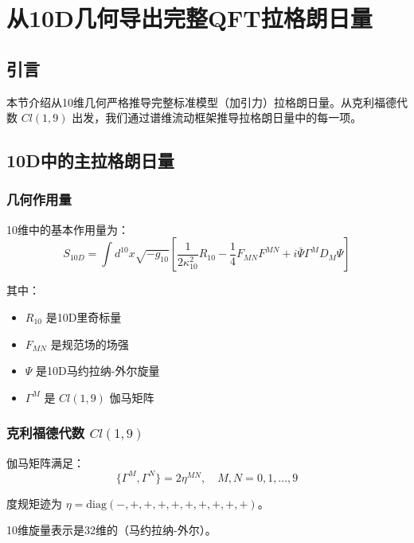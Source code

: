 \section{从10D几何导出完整QFT拉格朗日量}
\label{sec:qft_lagrangian_complete}

\subsection{引言}

本节介绍从10维几何严格推导完整标准模型（加引力）拉格朗日量。从克利福德代数 $Cl(1,9)$ 出发，我们通过谱维流动框架推导拉格朗日量中的每一项。

\subsection{10D中的主拉格朗日量}

\subsubsection{几何作用量}

10维中的基本作用量为：
\begin{equation}
    S_{10D} = \int d^{10}x \sqrt{-g_{10}} \left[ \frac{1}{2\kappa_{10}^2}R_{10} - \frac{1}{4}F_{MN}F^{MN} + i\bar{\Psi}\Gamma^M D_M \Psi \right]
\end{equation}

其中：
\begin{itemize}
    \item $R_{10}$ 是10D里奇标量
    \item $F_{MN}$ 是规范场的场强
    \item $\Psi$ 是10D马约拉纳-外尔旋量
    \item $\Gamma^M$ 是 $Cl(1,9)$ 伽马矩阵
\end{itemize}

\subsubsection{克利福德代数 $Cl(1,9)$}

伽马矩阵满足：
\begin{equation}
    \{\Gamma^M, \Gamma^N\} = 2\eta^{MN}, \quad M,N = 0,1,\ldots,9
\end{equation}

度规矩迹为 $\eta = \text{diag}(-,+,+,+,+,+,+,+,+,+)$。

10维旋量表示是32维的（马约拉纳-外尔）。

